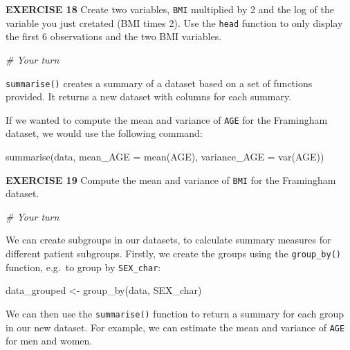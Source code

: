 \documentclass[
]{article}
\newenvironment{Shaded}{\begin{snugshade}}{\end{snugshade}}
\newcommand{\AttributeTok}[1]{\textcolor[rgb]{0.77,0.63,0.00}{#1}}
\newcommand{\CommentTok}[1]{\textcolor[rgb]{0.56,0.35,0.01}{\textit{#1}}}
\newcommand{\FunctionTok}[1]{\textcolor[rgb]{0.00,0.00,0.00}{#1}}
\newcommand{\NormalTok}[1]{#1}
\newcommand{\OtherTok}[1]{\textcolor[rgb]{0.56,0.35,0.01}{#1}}
\begin{document}
\textbf{EXERCISE 18} Create two variables, \texttt{BMI} multiplied by 2
and the log of the variable you just cretated (BMI times 2). Use the
\texttt{head} function to only display the first 6 observations and the
two BMI variables.

\begin{Shaded}
\begin{Highlighting}[]
\CommentTok{\# Your turn}
\end{Highlighting}
\end{Shaded}

\texttt{summarise()} creates a summary of a dataset based on a set of
functions provided. It returns a new dataset with columns for each
summary.

If we wanted to compute the mean and variance of \texttt{AGE} for the
Framingham dataset, we would use the following command:

\begin{Shaded}
\begin{Highlighting}[]
\FunctionTok{summarise}\NormalTok{(data, }\AttributeTok{mean\_AGE =} \FunctionTok{mean}\NormalTok{(AGE), }\AttributeTok{variance\_AGE =} \FunctionTok{var}\NormalTok{(AGE))}
\end{Highlighting}
\end{Shaded}

\textbf{EXERCISE 19} Compute the mean and variance of \texttt{BMI} for
the Framingham dataset.

\begin{Shaded}
\begin{Highlighting}[]
\CommentTok{\# Your turn}
\end{Highlighting}
\end{Shaded}

We can create subgroups in our datasets, to calculate summary measures
for different patient subgroups. Firstly, we create the groups using the
\texttt{group\_by()} function, e.g.~to group by \texttt{SEX\_char}:

\begin{Shaded}
\begin{Highlighting}[]
\NormalTok{data\_grouped }\OtherTok{\textless{}{-}} \FunctionTok{group\_by}\NormalTok{(data, SEX\_char)}
\end{Highlighting}
\end{Shaded}

We can then use the \texttt{summarise()} function to return a summary
for each group in our new dataset. For example, we can estimate the mean
and variance of \texttt{AGE} for men and women.
\end{document}
